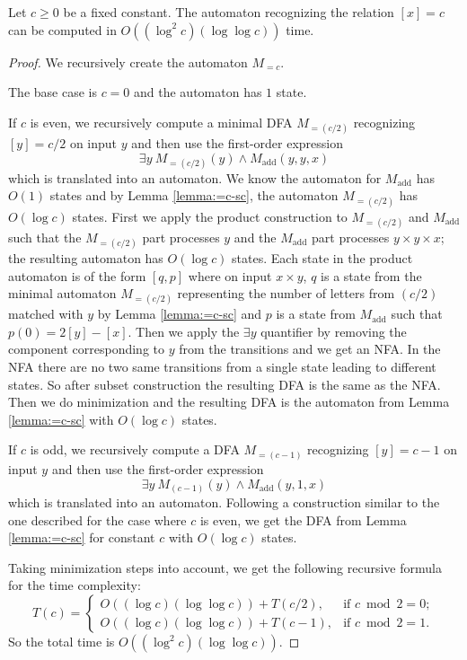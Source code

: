 \documentclass[12pt,reqno]{article}
\DeclareMathOperator{\add}{add}
\begin{document}
\begin{theorem} \label{theorem:=c}
    Let $c \geq 0$ be a fixed constant. The automaton recognizing the relation $[x] = c$ can be computed in $O((\log ^2 c)(\log \log c))$ time.
\end{theorem}
\begin{proof}
    We recursively create the automaton $M_{=c}$.

    The base case is $c=0$ and the automaton has $1$ state.
    
    If $c$ is even, we recursively compute a minimal DFA $M_{=(c/2)}$ recognizing $[y] = c/2$ on input $y$ and then use the first-order expression
    \[
    \exists y \ M_{=(c/2)}(y) \land M_{\add}(y, y, x)
    \]
    which is translated into an automaton.  We know the automaton for $M_{\add}$ has $O(1)$ states and by Lemma \ref{lemma:=c-sc}, the automaton $M_{=(c/2)}$ has $O(\log c)$ states. First we apply the product construction to $M_{=(c/2)}$ and $M_{\add}$ such that the $M_{=(c/2)}$ part processes $y$ and the $M_{\add}$ part processes $y \times y \times x$; the resulting automaton has $O(\log c)$ states. Each state in the product automaton is of the form $[q, p]$ where on input $x \times y$, $q$ is a state from the minimal automaton $M_{=(c/2)}$ representing the number of letters from $(c/2)$ matched with $y$ by Lemma \ref{lemma:=c-sc} and $p$ is a state from $M_{\add}$ such that  $p(0)= 2[y]-[x]$.
    Then we apply the $\exists y$ quantifier by removing the component corresponding to $y$ from the transitions and we get an NFA. In the NFA there are no two same transitions from a single state leading to different states. So after subset construction the resulting DFA is the same as the NFA. Then we do minimization and the resulting DFA is the automaton from Lemma \ref{lemma:=c-sc} with $O(\log c)$ states.

    If $c$ is odd, we recursively compute a DFA $M_{=(c-1)}$ recognizing $[y] = c-1$ on input $y$ and then use the first-order expression
    \[
    \exists y \ M_{(c-1)}(y) \land M_{\add}(y, 1, x)
    \]
    which is translated into an automaton. Following a construction similar to the one described for the case where $c$ is even, we get the DFA from Lemma \ref{lemma:=c-sc} for constant $c$ with $O(\log c)$ states.

    Taking minimization steps into account, we get the following recursive formula for the time complexity:
    \[  T(c) =
\begin{cases}
     O((\log c) (\log \log c)) + T(c/2), & \text{if $c \bmod 2 = 0$}; \\
    O((\log c) (\log \log c))  + T(c-1), & \text{if $c \bmod 2 = 1$}.
\end{cases}
\]
So the total time is $ O((\log^2  c) (\log \log c))$.
\end{proof}
\end{document}
